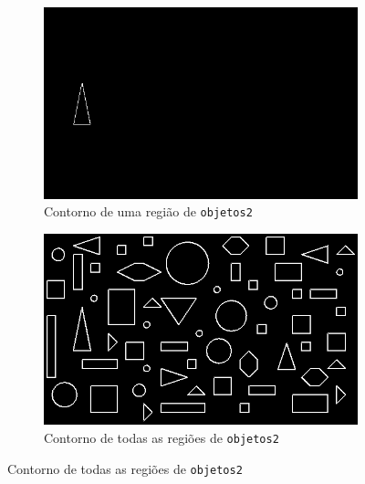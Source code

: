 \documentclass[brazilian,a4paper,twocolumn]{article}
\begin{document}
\begin{figure}[H]
            \begin{subfigure}{0.23\textwidth}
                \includegraphics[width=\textwidth,keepaspectratio]{contornos/objetos2-region-29-contornos}
                \caption{Contorno de uma região de \texttt{objetos2}}
                \label{fig:objetos2-contorno-isolado}
            \end{subfigure}
            \hfill
            \begin{subfigure}{0.23\textwidth}
                \includegraphics[width=\textwidth,keepaspectratio]{objetos2-contorno}
                \caption{Contorno de todas as regiões de \texttt{objetos2}}
                \label{fig:objetos2-contornos}
            \end{subfigure}


\end{figure}
\end{document}
